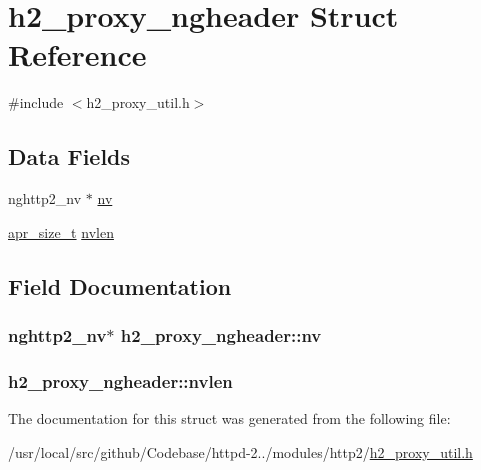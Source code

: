 \hypertarget{structh2__proxy__ngheader}{}\section{h2\+\_\+proxy\+\_\+ngheader Struct Reference}
\label{structh2__proxy__ngheader}


{\ttfamily \#include $<$h2\+\_\+proxy\+\_\+util.\+h$>$}

\subsection*{Data Fields}
\begin{DoxyCompactItemize}
\item 
nghttp2\+\_\+nv $\ast$ \hyperlink{structh2__proxy__ngheader_a712b52d887de9b9355fdea5e10812688}{nv}
\item 
\hyperlink{group__apr__platform_gaaa72b2253f6f3032cefea5712a27540e}{apr\+\_\+size\+\_\+t} \hyperlink{structh2__proxy__ngheader_a746180c4b5f973a7a64a2e8805568197}{nvlen}
\end{DoxyCompactItemize}


\subsection{Field Documentation}
\subsubsection[{\texorpdfstring{nv}{nv}}]{\setlength{\rightskip}{0pt plus 5cm}nghttp2\+\_\+nv$\ast$ h2\+\_\+proxy\+\_\+ngheader\+::nv}\hypertarget{structh2__proxy__ngheader_a712b52d887de9b9355fdea5e10812688}{}\label{structh2__proxy__ngheader_a712b52d887de9b9355fdea5e10812688}
\subsubsection[{\texorpdfstring{nvlen}{nvlen}}]{ h2\+\_\+proxy\+\_\+ngheader\+::nvlen}\hypertarget{structh2__proxy__ngheader_a746180c4b5f973a7a64a2e8805568197}{}\label{structh2__proxy__ngheader_a746180c4b5f973a7a64a2e8805568197}


The documentation for this struct was generated from the following file\+:\begin{DoxyCompactItemize}
\item 
/usr/local/src/github/\+Codebase/httpd-\/2../modules/http2/\hyperlink{h2__proxy__util_8h}{h2\+\_\+proxy\+\_\+util.\+h}\end{DoxyCompactItemize}
